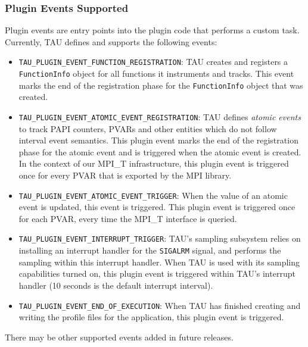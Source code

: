 \subsubsection{Plugin Events Supported}
Plugin events are entry points into the plugin code that performs a custom task. Currently, TAU defines and supports the following events:
\begin{itemize}
\item \verb+TAU_PLUGIN_EVENT_FUNCTION_REGISTRATION+: TAU creates and registers a \verb+FunctionInfo+ object for all functions it instruments and tracks. This event marks the end of the registration phase for the \verb+FunctionInfo+ object that was created.
\item \verb+TAU_PLUGIN_EVENT_ATOMIC_EVENT_REGISTRATION+: TAU defines \textit{atomic events} to track PAPI counters, PVARs and other entities which do not follow interval event semantics. This plugin event marks the end of the registration phase for the atomic event and is triggered when the atomic event is created. In the context of our MPI\_T infrastructure, this plugin event is triggered once for every PVAR that is exported by the MPI library.
\item \verb+TAU_PLUGIN_EVENT_ATOMIC_EVENT_TRIGGER+: When the value of an atomic event is updated, this event is triggered. This plugin event is triggered once for each PVAR, every time the MPI\_T interface is queried.
\item \verb+TAU_PLUGIN_EVENT_INTERRUPT_TRIGGER+: TAU's sampling subsystem relies on installing an interrupt handler for the \verb+SIGALRM+ signal, and performs the sampling within this interrupt handler. When TAU is used with its sampling capabilities turned on, this plugin event is triggered within TAU's interrupt handler (10 seconds is the default interrupt interval).
\item \verb+TAU_PLUGIN_EVENT_END_OF_EXECUTION+: When TAU has finished creating and writing the profile files for the application, this plugin event is triggered.
\end{itemize}
There may be other supported events added in future releases.

